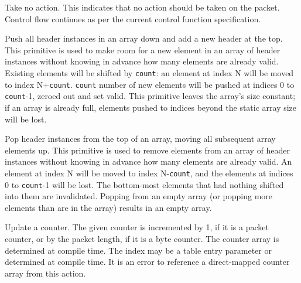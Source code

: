 \documentclass[12pt]{article}
\begin{document}
{ %
Take no action.
}
{ %
}
{ %
This indicates that no action should be taken on the packet. Control flow 
continues as per the current control function specification. 
}


{ %
Push all header instances in an array down and add a new header at the top.
}
{ %
}
{ %
This primitive is used to make room for a new element in an array of header
instances without knowing in advance how many elements are already valid. 
Existing elements will be shifted by \texttt{count}: an
element at index N will be moved to index N+\texttt{count}. 
\texttt{count} number of new elements will be pushed at indices 0 to 
\texttt{count}-1, zeroed out and set valid.
This primitive leaves the array's size constant; if an array is already full,
elements pushed to indices beyond the static array size will be lost.
}


{ %
Pop header instances from the top of an array, moving all subsequent array elements up.
}
{ %
}
{ %
This primitive is used to remove elements from an array of header instances
without knowing in advance how many elements are already valid. An element at
index N will be moved to index N-\texttt{count}, and the elements at indices 0 to 
\texttt{count}-1 will be lost. The bottom-most elements that had nothing 
shifted into them are invalidated.
Popping from an empty array (or popping more elements than are in the array)
results in an empty array.
}


{ %
Update a counter.
}
{ %
}
{ %
The given counter is incremented by 1, if it is a packet counter, or by the 
packet length, if it is a byte counter.  The counter array is determined 
at compile time.  The index may be a table entry parameter or determined at 
compile time. It is an error to reference a direct-mapped counter array from 
this action.
}
\end{document}
